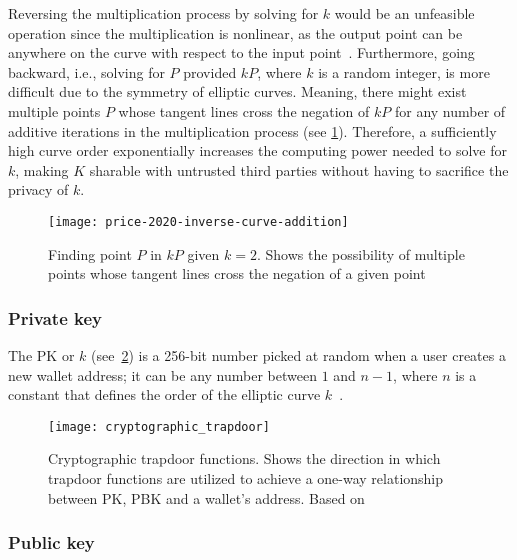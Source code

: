 Reversing the multiplication process by solving for $k$ would be an unfeasible operation since the multiplication is nonlinear, as the output point can be anywhere on the curve with respect to the input point~\autocite{price_bitcoins_2020}.
Furthermore, going backward, i.e., solving for $P$ provided $kP$, where $k$ is a random integer, is more difficult due to the symmetry of elliptic curves.
Meaning, there might exist multiple points $P$ whose tangent lines cross the negation of $kP$ for any number of additive iterations in the multiplication process (see \cref{fig:finding-point-p}).
Therefore, a sufficiently high curve order exponentially increases the computing power needed to solve for $k$, making $K$ sharable with untrusted third parties without having to sacrifice the privacy of $k$.

\begin{figure}[H]
    \begin{center}
        \texttt{[image: price-2020-inverse-curve-addition]}
    \end{center}
    \caption[Finding point $P$ in $kP$ given $k=2$]{Finding point $P$ in $kP$ given $k=2$.
    Shows the possibility of multiple points whose tangent lines cross the negation of a given point~\autocite{price_bitcoins_2020}}
    \label{fig:finding-point-p}
\end{figure}

\subsubsection{Private key}\label{subsubsec:private-key}

The \gls{PK} or $k$ (see~\cref{fig:elliptic-curve-trapdoor}) is a 256-bit number picked at random when a user creates a new wallet address;
it can be any number between $1$ and $n-1$, where $n$ is a constant that defines the order of the elliptic curve $k$~\autocite[63]{antonopoulos_mastering_2017}.

\begin{figure}[H]
    \texttt{[image: cryptographic\_trapdoor]}
    \caption[Cryptographic trapdoor functions]{Cryptographic trapdoor functions. Shows the direction in which trapdoor functions are utilized to achieve a one-way relationship between \gls{PK}, \gls{PBK} and a wallet's address. Based on~\textcite[160]{antonopoulos_mastering_2017}}
    \label{fig:elliptic-curve-trapdoor}
\end{figure}

\subsubsection{Public key}\label{subsubsec:public-key}

